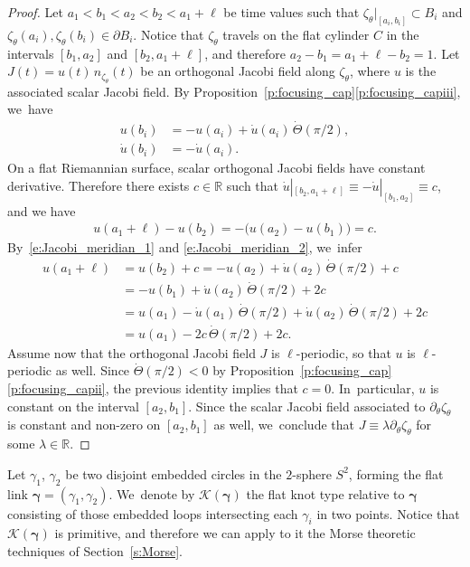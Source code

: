 \documentclass[JEP,XML,SOM,Unicode,NoFloatCountersInSection,published]{cedram}
\let\bm\boldsymbol
\newcommand{\R}{\mathbb{R}}
\newcommand{\KK}{\mathcal{K}}
\theoremstyle{plain}
\theoremstyle{definition}
\begin{document}
\begin{proof}
Let $a_1<b_1<a_2<b_2<a_1+\ell$ be time values such that $\zeta_\theta|_{[a_i,b_i]}\subset B_i$ and $\zeta_\theta(a_i),\zeta_\theta(b_i)\in\partial B_i$. Notice that $\zeta_\theta$ travels on the flat cylinder $C$ in the intervals $[b_1,a_2]$ and $[b_2,a_1+\ell]$, and therefore $a_2-b_1=a_1+\ell-b_2=1$. Let $J(t)=u(t)\,n_{\zeta_\theta}(t)$ be an orthogonal Jacobi field along $\zeta_\theta$, where $u$ is the associated scalar Jacobi field.
By Proposition~\ref{p:focusing_cap}\eqref{p:focusing_capiii}, we~have
\begin{equation}
\label{e:Jacobi_meridian_1}
\begin{split}
u(b_i) & = -u(a_i)+\dot u(a_i)\,\dot\Theta(\pi/2),
\\
\dot u(b_i) & = -\dot u(a_i).
\end{split}
\end{equation}
On a flat Riemannian surface, scalar orthogonal Jacobi fields have constant derivative. Therefore there exists $c\in\R$ such that
$\dot u|_{[b_2,a_1+\ell]}\equiv - \dot u|_{[b_1,a_2]} \equiv c$,
and we have
\begin{align}
\label{e:Jacobi_meridian_2}
u(a_1+\ell)-u(b_2)
=
-\big(u(a_2)-u(b_1)\big)
=
c.
\end{align}
By~\eqref{e:Jacobi_meridian_1} and \eqref{e:Jacobi_meridian_2}, we~infer
\begin{align*}
u(a_1+\ell)
& = u(b_2)+c
= -u(a_2) + \dot u(a_2)\,\dot\Theta(\pi/2) +c \\
& = -u(b_1) + \dot u(a_2)\,\dot\Theta(\pi/2) + 2c \\
& = u(a_1) - \dot u(a_1)\,\dot\Theta(\pi/2) + \dot u(a_2)\,\dot\Theta(\pi/2) + 2c\\
& = u(a_1) -2c\,\dot\Theta(\pi/2) + 2c.
\end{align*}
Assume now that the orthogonal Jacobi field $J$ is $\ell$-periodic, so that $u$ is $\ell$-periodic as well. Since $\dot\Theta(\pi/2)<0$ by Proposition~\ref{p:focusing_cap}\eqref{p:focusing_capii}, the previous identity implies that $c=0$. In~particular, $u$ is constant on the interval $[a_2,b_1]$. Since the scalar Jacobi field associated to $\partial_\theta\zeta_\theta$ is constant and non-zero on $[a_2,b_1]$ as well, we~conclude that $J\equiv\lambda \partial_\theta\zeta_\theta$ for some $\lambda\in\R$.
\end{proof}

Let $\gamma_1$, $\gamma_2$ be two disjoint embedded circles in the $2$-sphere $S^2$, forming the flat link $\bm\gamma=(\gamma_1,\gamma_2)$. We~denote by $\KK(\bm\gamma)$ the flat knot type relative to $\bm\gamma$ consisting of those embedded loops intersecting each $\gamma_i$ in two points. Notice that $\KK(\bm\gamma)$ is primitive, and therefore we can apply to it the Morse theoretic techniques of Section~\ref{s:Morse}.
\end{document}

